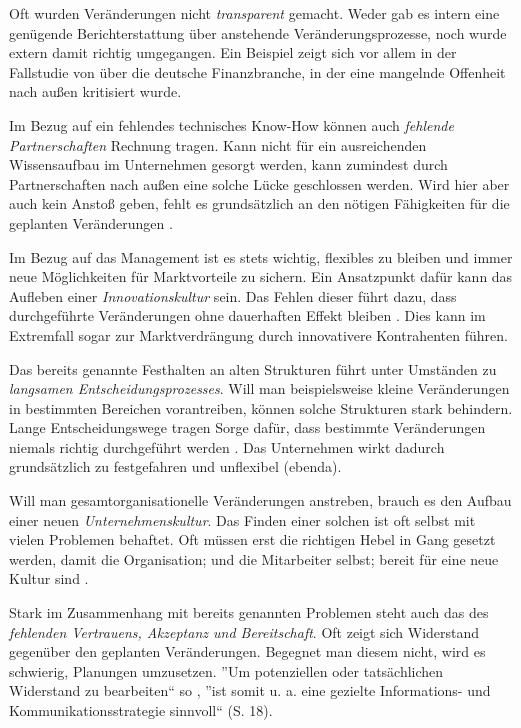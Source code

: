 Oft wurden Veränderungen nicht \textit{transparent} gemacht. Weder gab es intern eine genügende Berichterstattung über anstehende Veränderungsprozesse, noch wurde extern damit richtig umgegangen. Ein Beispiel zeigt sich vor allem in der Fallstudie von  über die deutsche Finanzbranche, in der eine mangelnde Offenheit nach außen kritisiert wurde.

Im Bezug auf ein fehlendes technisches Know-How können auch \textit{fehlende Partnerschaften} Rechnung tragen. Kann nicht für ein ausreichenden Wissensaufbau im Unternehmen gesorgt werden, kann zumindest durch Partnerschaften nach außen eine solche Lücke geschlossen werden. Wird hier aber auch kein Anstoß geben, fehlt es grundsätzlich an den nötigen Fähigkeiten für die geplanten Veränderungen \cite[S. 9]{nowik_promoting_2018}.

Im Bezug auf das Management ist es stets wichtig, flexibles zu bleiben und immer neue Möglichkeiten für Marktvorteile zu sichern. Ein Ansatzpunkt dafür kann das Aufleben einer \textit{Innovationskultur} sein. Das Fehlen dieser führt dazu, dass durchgeführte Veränderungen ohne dauerhaften Effekt bleiben \cite[S. 25]{weber_digital_2015}. Dies kann im Extremfall sogar zur Marktverdrängung durch innovativere Kontrahenten führen.

Das bereits genannte Festhalten an alten Strukturen führt unter Umständen zu \textit{langsamen Entscheidungsprozesses}. Will man beispielsweise kleine Veränderungen in bestimmten Bereichen vorantreiben, können solche Strukturen stark behindern. Lange Entscheidungswege tragen Sorge dafür, dass bestimmte Veränderungen niemals richtig durchgeführt werden \cite[S. 12]{depiereux_studie_2018}. Das Unternehmen wirkt dadurch grundsätzlich zu festgefahren und unflexibel (ebenda).

Will man gesamtorganisationelle Veränderungen anstreben, brauch es den Aufbau einer neuen \textit{Unternehmenskultur}. Das Finden einer solchen ist oft selbst mit vielen Problemen behaftet. Oft müssen erst die richtigen Hebel in Gang gesetzt werden, damit die Organisation; und die Mitarbeiter selbst; bereit für eine neue Kultur sind \cite[S. 30]{kremins_2018_2018}.

Stark im Zusammenhang mit bereits genannten Problemen steht auch das des \textit{fehlenden Vertrauens, Akzeptanz und Bereitschaft}. Oft zeigt sich Widerstand gegenüber den geplanten Veränderungen. Begegnet man diesem nicht, wird es schwierig, Planungen umzusetzen.  ''Um potenziellen oder tatsächlichen Widerstand zu bearbeiten`` so ,  ''ist somit u. a. eine gezielte Informations- und Kommunikationsstrategie sinnvoll`` (S. 18).

